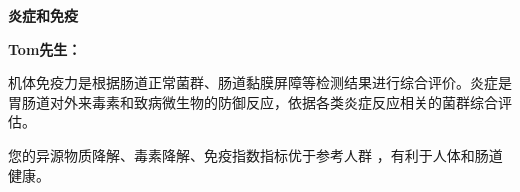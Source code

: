 

\usepackage{graphicx}
\graphicspath{{cores/}}



\setlength{\arrayrulewidth}{0.5pt}
\fontsize{9.3pt}{17pt}\selectfont
\color{gray2}

\vspace*{0mm}
\begin{center}
{\bf\sanhao 炎症和免疫}
\end{center}

\medskip

\noindent
{\bf\xiaosihao Tom先生：}

\bigskip

机体免疫力是根据肠道正常菌群、肠道黏膜屏障等检测结果进行综合评价。炎症是胃肠道对外来毒素和致病微生物的防御反应，依据各类炎症反应相关的菌群综合评估。

您的异源物质降解、毒素降解、免疫指数指标优于参考人群
，有利于人体和肠道健康。

